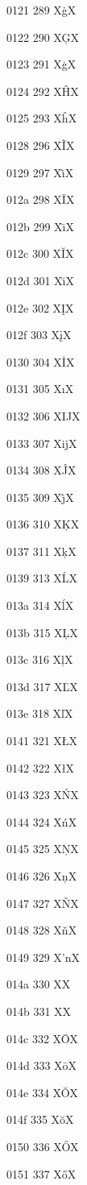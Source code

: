 \documentclass[11pt]{article}
\begin{document}
0121 289 X{\.g}X

0122 290 X{\c{G}}X

0123 291 X{\c{g}}X

0124 292 X{\^H}X

0125 293 X{\^h}X

0128 296 X{\~I}X

0129 297 X{\~{\i}}X

012a 298 X{\=I}X

012b 299 X{\={\i}}X

012c 300 X{\u{I}}X

012d 301 X{\u{\i}}X

012e 302 X{\k{I}}X

012f 303 X{\k{i}}X

0130 304 X{\.I}X

0131 305 X{\i{}}X

0132 306 X{IJ}X

0133 307 X{ij}X

0134 308 X{\^J}X

0135 309 X{\^{\j}}X

0136 310 X{\c{K}}X

0137 311 X{\c{k}}X

0139 313 X{\'L}X

013a 314 X{\'l}X

013b 315 X{\c{L}}X

013c 316 X{\c{l}}X

013d 317 X{\v{L}}X

013e 318 X{\v{l}}X

0141 321 X{\L{}}X

0142 322 X{\l{}}X

0143 323 X{\'N}X

0144 324 X{\'n}X

0145 325 X{\c{N}}X

0146 326 X{\c{n}}X

0147 327 X{\v{N}}X

0148 328 X{\v{n}}X

0149 329 X{'n}X

014a 330 X{\NG}X

014b 331 X{\ng}X

014c 332 X{\=O}X

014d 333 X{\=o}X

014e 334 X{\u{O}}X

014f 335 X{\u{o}}X

0150 336 X{\H{O}}X

0151 337 X{\H{o}}X
\end{document}
